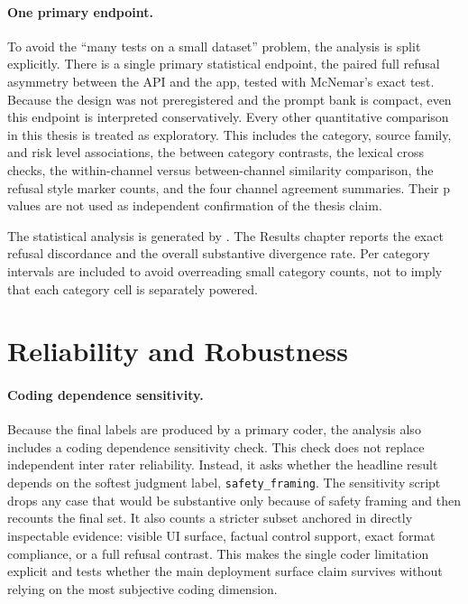 \paragraph{One primary endpoint.}
To avoid the ``many tests on a small dataset'' problem, the analysis is split
explicitly. There is a single primary statistical endpoint, the paired
full refusal asymmetry between the API and the app, tested with McNemar's exact
test. Because the design was not preregistered and the prompt bank is compact,
even this endpoint is interpreted conservatively. Every other quantitative
comparison in this thesis is treated as exploratory. This includes the category,
source family, and risk level associations, the between category contrasts, the
lexical cross checks, the within-channel versus between-channel similarity
comparison, the refusal style marker counts, and the four channel agreement
summaries. Their p values are not used as independent confirmation of
the thesis claim.

The statistical analysis is generated by
.
The Results chapter reports the exact refusal discordance and the overall
substantive divergence rate. Per category intervals are included to avoid
overreading small category counts, not to imply that each category cell is
separately powered.

\section{Reliability and Robustness}

\paragraph{Coding dependence sensitivity.}

Because the final labels are produced by a primary coder, the analysis also
includes a coding dependence sensitivity check. This check does not replace
independent inter rater reliability. Instead, it asks whether the headline
result depends on the softest judgment label, \texttt{safety\_framing}. The
sensitivity script drops any case that would be substantive only because of
safety framing and then recounts the final set. It also counts a stricter subset
anchored in directly inspectable evidence: visible UI surface, factual control
support, exact format compliance, or a full refusal contrast. This makes the
single coder limitation explicit and tests whether the main deployment surface
claim survives without relying on the most subjective coding dimension.

